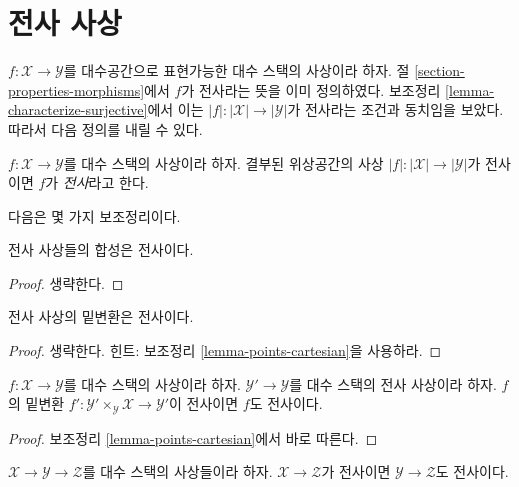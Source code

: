\section{전사 사상}
\label{section-surjective}

\noindent
$f : \mathcal{X} \to \mathcal{Y}$를 대수공간으로 표현가능한
대수 스택의 사상이라 하자. 절 \ref{section-properties-morphisms}에서
$f$가 전사라는 뜻을 이미 정의하였다. 보조정리
\ref{lemma-characterize-surjective}에서 이는
$|f| : |\mathcal{X}| \to |\mathcal{Y}|$가 전사라는 조건과
동치임을 보았다. 따라서 다음 정의를 내릴 수 있다.

\begin{definition}
\label{definition-surjective}
$f : \mathcal{X} \to \mathcal{Y}$를 대수 스택의 사상이라 하자.
결부된 위상공간의 사상
$|f| : |\mathcal{X}| \to |\mathcal{Y}|$가 전사이면
$f$가 {\it 전사}라고 한다.
\end{definition}

\noindent
다음은 몇 가지 보조정리이다.

\begin{lemma}
\label{lemma-composition-surjective}
전사 사상들의 합성은 전사이다.
\end{lemma}

\begin{proof}
생략한다.
\end{proof}

\begin{lemma}
\label{lemma-base-change-surjective}
전사 사상의 밑변환은 전사이다.
\end{lemma}

\begin{proof}
생략한다. 힌트: 보조정리 \ref{lemma-points-cartesian}을 사용하라.
\end{proof}

\begin{lemma}
\label{lemma-descent-surjective}
$f : \mathcal{X} \to \mathcal{Y}$를 대수 스택의 사상이라 하자.
$\mathcal{Y}' \to \mathcal{Y}$를 대수 스택의 전사 사상이라 하자.
$f$의 밑변환
$f' : \mathcal{Y}' \times_\mathcal{Y} \mathcal{X}
\to \mathcal{Y}'$이 전사이면 $f$도 전사이다.
\end{lemma}

\begin{proof}
보조정리 \ref{lemma-points-cartesian}에서 바로 따른다.
\end{proof}

\begin{lemma}
\label{lemma-surjective-permanence}
$\mathcal{X} \to \mathcal{Y} \to \mathcal{Z}$를 대수 스택의
사상들이라 하자. $\mathcal{X} \to \mathcal{Z}$가 전사이면
$\mathcal{Y} \to \mathcal{Z}$도 전사이다.
\end{lemma}


